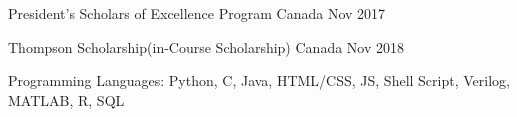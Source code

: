 


\begin{cvhonors}

  \cvhonor
    {}
    {President’s Scholars of Excellence Program} %
    {Canada} %
    {Nov 2017} %

  \cvhonor
    {}
    {Thompson Scholarship(in-Course Scholarship)} %
    {Canada} %
    {Nov 2018} %

  \cvhonor
    {}
    {Programming Languages: Python, C, Java, HTML/CSS, JS, Shell Script, Verilog, MATLAB, R, SQL} %
    {}
    {}

\end{cvhonors}
